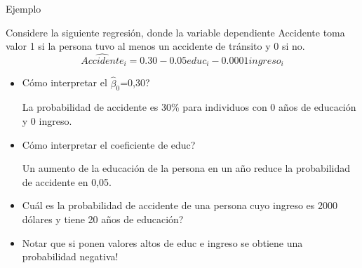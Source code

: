 \documentclass{beamer}
\begin{document}
\begin{frame}{Ejemplo}

Considere la siguiente regresi\'on, donde la variable dependiente {\color{blue}Accidente}
toma valor 1 si la persona tuvo al menos un accidente de tr\'ansito y 0 si no.
$$\widehat{Accidente}_i = 0.30 -0.05educ_i -0.0001ingreso_i $$
\begin{itemize}
    \item C\'omo interpretar el $\hat{\beta}_0$=0,30? 

La probabilidad de accidente es 30\% para
individuos con 0 años de educaci\'on y 0 ingreso.
    \item C\'omo interpretar el coeficiente de educ? 

Un aumento de la educaci\'on de la
persona en un año reduce la probabilidad de accidente en 0,05.
    \item  Cu\'al es la probabilidad de accidente de una persona cuyo ingreso es 2000
d\'olares y tiene 20 años de educaci\'on? 


\item Notar que si ponen valores altos de educ e ingreso se obtiene una
probabilidad negativa!
\end{itemize}
    
\end{frame}
\end{document}

